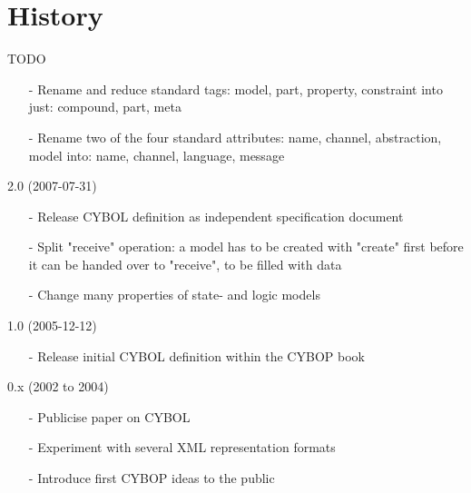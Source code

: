%
%
%
%
%
%

\section{History}
\label{history_heading}

TODO

\begin{itemize}
    \item[-] Rename and reduce standard tags: model, part, property, constraint
        into just: compound, part, meta
    \item[-] Rename two of the four standard attributes: name, channel, abstraction, model
        into: name, channel, language, message
\end{itemize}

2.0 (2007-07-31)

\begin{itemize}
    \item[-] Release CYBOL definition as independent specification document
    \item[-] Split "receive" operation: a model has to be created with "create"
        first before it can be handed over to "receive", to be filled with data
    \item[-] Change many properties of state- and logic models
\end{itemize}

1.0 (2005-12-12)

\begin{itemize}
    \item[-] Release initial CYBOL definition within the CYBOP book \cite{cybopbook}
\end{itemize}

0.x (2002 to 2004)

\begin{itemize}
    \item[-] Publicise paper on CYBOL \cite{heller2004}
    \item[-] Experiment with several XML representation formats
    \item[-] Introduce first CYBOP ideas to the public \cite{heller2002}
\end{itemize}
